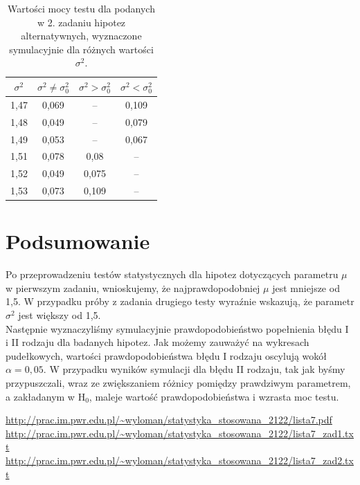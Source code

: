 \documentclass[12pt]{mwart}
\begin{document}
	\begin{table}[H]
		\centering
		\begin{tabular}{ |c|c|c|c| } 
			\hline
			\vphantom{ $1^{1^1}$} $\sigma^2$ \vphantom{ $1^{1^{1^1}}$} & $\sigma^2 \neq \sigma_0^2$ & $\sigma^2 > \sigma_0^2$ & $\sigma^2 < \sigma_0^2$ \\\hline
			1,47 & 0,069 & -- & 0,109 \\\hline
			1,48 & 0,049 & -- & 0,079 \\\hline
			1,49 & 0,053 & -- & 0,067 \\\hline
			1,51 & 0,078 & 0,08 & -- \\\hline
			1,52 & 0,049 & 0,075 & -- \\\hline
			1,53 & 0,073 & 0,109 & -- \\\hline
		\end{tabular}
		\caption{Wartości mocy testu dla podanych w 2. zadaniu hipotez alternatywnych, wyznaczone symulacyjnie dla różnych wartości $\sigma^2$.}
	\end{table}
	
	
	
	\section{Podsumowanie}
	\noindent Po przeprowadzeniu testów statystycznych dla hipotez dotyczących parametru $\mu$ w pierwszym zadaniu, wnioskujemy, że najprawdopodobniej $\mu$ jest mniejsze od 1,5. W przypadku próby z zadania drugiego testy wyraźnie wskazują, że parametr $\sigma^2$ jest większy od 1,5.\\ Następnie wyznaczyliśmy symulacyjnie prawdopodobieństwo popełnienia błędu I
	i II rodzaju dla badanych hipotez. Jak możemy zauważyć na wykresach pudełkowych, wartości prawdopodobieństwa błędu I rodzaju oscylują wokół $\alpha = 0,05$. W przypadku wyników symulacji dla błędu II rodzaju, tak jak byśmy przypuszczali, wraz ze zwiększaniem różnicy pomiędzy prawdziwym parametrem, a zakładanym w $\mathrm{H}_0$, maleje wartość prawdopodobieństwa i wzrasta moc testu.
	
	
	
	\newpage
	\begin{thebibliography}{1}
		\url{http://prac.im.pwr.edu.pl/~wyloman/statystyka_stosowana_2122/lista7.pdf}
		\url{http://prac.im.pwr.edu.pl/~wyloman/statystyka_stosowana_2122/lista7_zad1.txt}
		\url{http://prac.im.pwr.edu.pl/~wyloman/statystyka_stosowana_2122/lista7_zad2.txt}
	\end{thebibliography}
\end{document}
